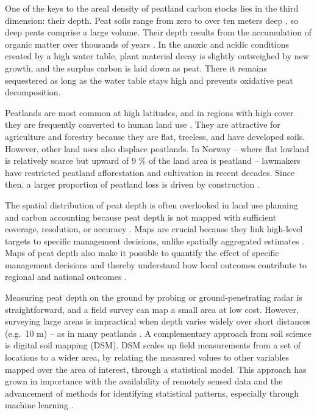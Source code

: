 \documentclass[soil, manuscript]{copernicus}
\begin{document}
One of the keys to the areal density of peatland carbon stocks lies in the third dimension: their depth.
Peat soils range from zero to over ten meters deep \citep{widyastutiPEATGRIDSMappingThickness2024}, so deep peats comprise a large volume.
Their depth results from the accumulation of organic matter over thousands of years \citep{loiselDatabaseSynthesisNorthern2014, joostenRolePeatlandsClimate2016}.
In the anoxic and acidic conditions created by a high water table, plant material decay is slightly outweighed by new growth, and the surplus carbon is laid down as peat.
There it remains sequestered as long as the water table stays high and prevents oxidative peat decomposition.

Peatlands are most common at high latitudes, and in regions with high cover they are frequently converted to human land use \citep{unepGlobalPeatlandsAssessment2022}.
They are attractive for agriculture and forestry because they are flat, treeless, and have developed soils.
However, other land uses also displace peatlands.
In Norway -- where flat lowland is relatively scarce but upward of 9 \% of the land area is peatland \citep{brynLandCoverNorway2018, bakkestuenDelineationWetlandAreas2023} -- lawmakers have restricted peatland afforestation and cultivation in recent decades.
Since then, a larger proportion of peatland loss is driven by construction \citep{flagetMyrMellomLokal2024}.

The spatial distribution of peat depth is often overlooked in land use planning and carbon accounting because peat depth is not mapped with sufficient coverage, resolution, or accuracy \citep{beilmanPeatCarbonStocks2008, hastieRisksCarbonStorage2022, unepGlobalPeatlandsAssessment2022}.
Maps are crucial because they link high-level targets to specific management decisions, unlike spatially aggregated estimates \citep{oecdOECDEnvironmentalPerformance2022}.
Maps of peat depth also make it possible to quantify the effect of specific management decisions and thereby understand how local outcomes contribute to regional and national outcomes \citep{oecdOECDEnvironmentalPerformance2022}.

Measuring peat depth on the ground by probing or ground-penetrating radar is straightforward, and a field survey can map a small area at low cost.
However, surveying large areas is impractical when depth varies widely over short distances (e.g.~10 m) -- as in many peatlands \citep{torppaStatisticalApproachDetermining2011, proulx-mcinnisReviewGroundpenetratingRadar2013, henrionMappingMonitoringPeatlands2024}.
A complementary approach from soil science is digital soil mapping (DSM).
DSM scales up field measurements from a set of locations to a wider area, by relating the measured values to other variables mapped over the area of interest, through a statistical model.
This approach has grown in importance with the availability of remotely sensed data and the advancement of methods for identifying statistical patterns, especially through machine learning \citep{minasnyDigitalMappingPeatlands2019, wadouxMachineLearningDigital2020}.
\end{document}
